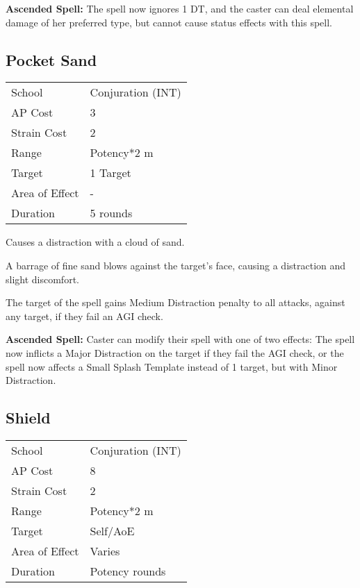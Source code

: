 \documentclass[11pt,a4paper,twocolumn]{book}
\begin{document}
\bigskip

\textbf{Ascended Spell:} The spell now ignores 1 DT, and the caster can deal elemental damage of her preferred type, but cannot cause status effects with this spell.


\subsection*{Pocket Sand}
{
	\begin{tabu} to 75mm{| X[l,4] | X[l,7] |}
		\hline
		School         & Conjuration (INT) \\
		AP Cost        & 3                 \\
		Strain Cost    & 2                 \\
		Range          & Potency*2 m       \\
		Target         & 1 Target          \\
		Area of Effect & -                 \\
		Duration       & 5 rounds          \\ \hline
	\end{tabu}
	
}

\medskip

Causes a distraction with a cloud of sand.

A barrage of fine sand blows against the target's face, causing a distraction and slight discomfort.

The target of the spell gains Medium Distraction penalty to all attacks, against any target, if they fail an AGI check.

\bigskip

\textbf{Ascended Spell:} Caster can modify their spell with one of two effects: The spell now inflicts a Major Distraction on the target if they fail the AGI check, or the spell now affects a Small Splash Template instead of 1 target, but with Minor Distraction.

\vfill

\subsection*{Shield}
{
	\begin{tabu} to 75mm{| X[l,4] | X[l,7] |}
		\hline
		School 			& Conjuration (INT) 		\\
		AP Cost	      	& 8 						\\
		Strain Cost     & 2 						\\
		Range     		& Potency*2	m				\\
		Target      	& Self/AoE					\\
		Area of Effect  & Varies  	 				\\
		Duration     	& Potency rounds			\\ \hline
	\end{tabu}
	
}
\end{document}
